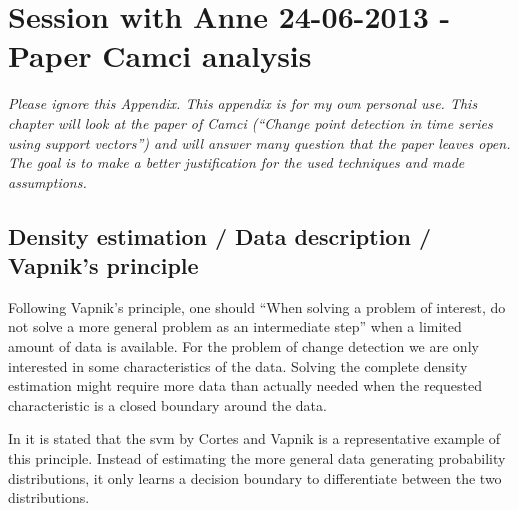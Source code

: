 
\chapter{Session with Anne 24-06-2013 - Paper Camci analysis} %

\label{AppendixB} %


\emph{Please ignore this Appendix.
This appendix is for my own personal use.
This chapter will look at the paper of Camci \cite{camci2010change} (``Change point detection in time series using support vectors'') and will answer many question that the paper leaves open.
The goal is to make a better justification for the used techniques and made assumptions.
}


\section{Density estimation / Data description / Vapnik's principle}
Following Vapnik's principle, one should ``When solving a problem of interest, do not solve a more general problem as an intermediate step'' \cite{vapnik1998statistical} when a limited amount of data is available.
For the problem of change detection we are only interested in some characteristics of the data.
Solving the complete density estimation might require more data than actually needed when the requested characteristic is a closed boundary around the data.

In \cite{liu2013change} it is stated that the \gls{svm} by Cortes and Vapnik \cite{cortes1995support} is a representative example of this principle.
Instead of estimating the more general data generating probability distributions, it only learns a decision boundary to differentiate between the two distributions.

